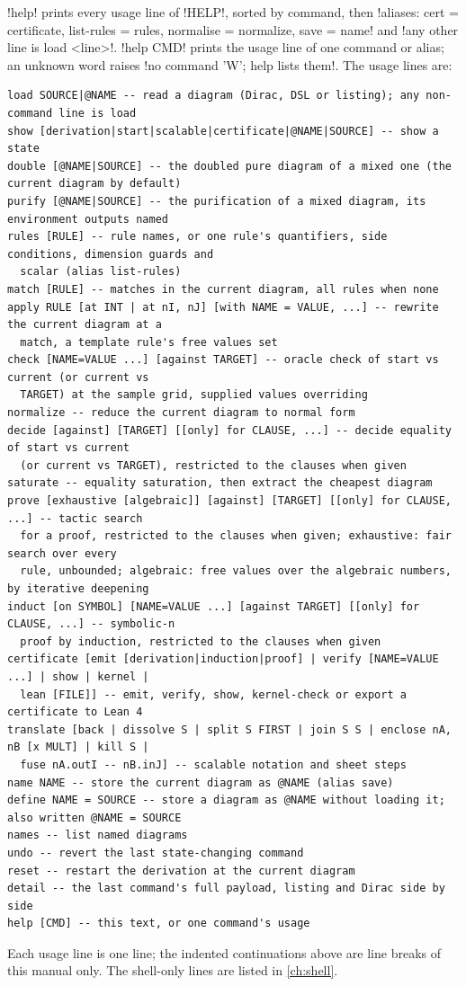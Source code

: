 \azx!help! prints every usage line of \py!HELP!, sorted by command, then \code!aliases: cert = certificate, list-rules = rules, normalise = normalize, save = name! and \code!any other line is load <line>!. \azx!help CMD! prints the usage line of one command or alias; an unknown word raises \code!no command 'W'; help lists them!. The usage lines are:
\begin{lstlisting}[style=grammar]
load SOURCE|@NAME -- read a diagram (Dirac, DSL or listing); any non-command line is load
show [derivation|start|scalable|certificate|@NAME|SOURCE] -- show a state
double [@NAME|SOURCE] -- the doubled pure diagram of a mixed one (the current diagram by default)
purify [@NAME|SOURCE] -- the purification of a mixed diagram, its environment outputs named
rules [RULE] -- rule names, or one rule's quantifiers, side conditions, dimension guards and
  scalar (alias list-rules)
match [RULE] -- matches in the current diagram, all rules when none
apply RULE [at INT | at nI, nJ] [with NAME = VALUE, ...] -- rewrite the current diagram at a
  match, a template rule's free values set
check [NAME=VALUE ...] [against TARGET] -- oracle check of start vs current (or current vs
  TARGET) at the sample grid, supplied values overriding
normalize -- reduce the current diagram to normal form
decide [against] [TARGET] [[only] for CLAUSE, ...] -- decide equality of start vs current
  (or current vs TARGET), restricted to the clauses when given
saturate -- equality saturation, then extract the cheapest diagram
prove [exhaustive [algebraic]] [against] [TARGET] [[only] for CLAUSE, ...] -- tactic search
  for a proof, restricted to the clauses when given; exhaustive: fair search over every
  rule, unbounded; algebraic: free values over the algebraic numbers, by iterative deepening
induct [on SYMBOL] [NAME=VALUE ...] [against TARGET] [[only] for CLAUSE, ...] -- symbolic-n
  proof by induction, restricted to the clauses when given
certificate [emit [derivation|induction|proof] | verify [NAME=VALUE ...] | show | kernel |
  lean [FILE]] -- emit, verify, show, kernel-check or export a certificate to Lean 4
translate [back | dissolve S | split S FIRST | join S S | enclose nA, nB [x MULT] | kill S |
  fuse nA.outI -- nB.inJ] -- scalable notation and sheet steps
name NAME -- store the current diagram as @NAME (alias save)
define NAME = SOURCE -- store a diagram as @NAME without loading it; also written @NAME = SOURCE
names -- list named diagrams
undo -- revert the last state-changing command
reset -- restart the derivation at the current diagram
detail -- the last command's full payload, listing and Dirac side by side
help [CMD] -- this text, or one command's usage
\end{lstlisting}
Each usage line is one line; the indented continuations above are line breaks of this manual only. The shell-only lines are listed in \cref{ch:shell}.

